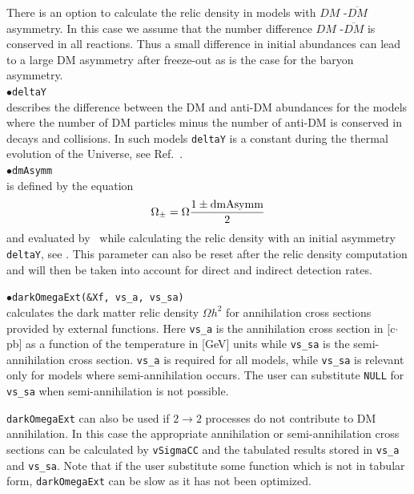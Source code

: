 \documentclass[12pt,a4paper]{article}
\begin{document}
There is an option to calculate the relic density in  models with  $DM$ -$\overline{DM}$ asymmetry.  
In this case we assume that the  number difference   $DM$ -$\overline{DM}$ is conserved in all reactions.
Thus a small difference in initial abundances can lead to a  large DM asymmetry after freeze-out as is the case for the  baryon
asymmetry.\\

\noindent
$\bullet$\verb|deltaY|\\
describes the difference between the DM and anti-DM abundances for the
models where the number of DM particles minus the number of anti-DM is conserved in
decays and collisions. In such models \verb|deltaY| is a
constant during the thermal evolution of the Universe,   see Ref.~\cite{Belanger:2013oya}.\\
\noindent
$\bullet$\verb|dmAsymm|\\
is defined by the equation 
$$ \Omega_{\pm} = \Omega \frac{1 \pm {\rm dmAsymm}}{2}$$
and evaluated  by \micro\ while calculating the relic density  with an
initial asymmetry \verb|deltaY|, see \cite{Belanger:2013oya}. 
This parameter can also be reset  after the relic density 
computation and will then be taken into account for direct and 
indirect detection rates.

\noindent
$\bullet$\verb|darkOmegaExt(&Xf, vs_a, vs_sa)|\\
calculates the dark matter relic density $\Omega h^2$  
for  annihilation cross sections  provided by  external 
functions. Here  \verb|vs_a| is the  annihilation cross section in [c$\cdot$pb] as 
a function of the temperature in [GeV] units while  \verb|vs_sa| 
is the semi-annihilation cross section.  \verb|vs_a| is required for all models, 
while \verb|vs_sa| is relevant only for models where semi-annihilation occurs.  The user 
can  substitute {\tt NULL} for \verb|vs_sa| when semi-annihilation is not possible.
 
 {\tt darkOmegaExt}   can also be used 
if $ 2 \to 2$ processes do not contribute  to DM  annihilation. In this case the appropriate annihilation or  semi-annihilation
cross sections can be calculated by {\tt vSigmaCC} and the tabulated results stored in \verb|vs_a| and \verb|vs_sa|. Note that if the user substitute some function which is not in tabular form, {\tt darkOmegaExt} can be  slow as it has not been optimized. 
\end{document}
